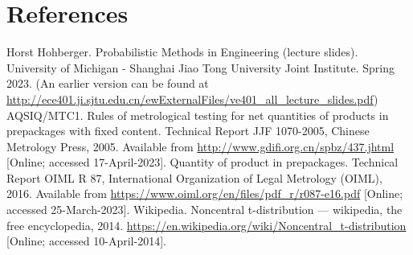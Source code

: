 \documentclass[12pt]{article}
\begin{document}
\newpage
    \section{References}
    \begingroup  %
    \renewcommand{\section}[2]{} 
    \begin{thebibliography}{99}
         Horst Hohberger. Probabilistic Methods in Engineering (lecture slides). University of Michigan - Shanghai Jiao Tong University Joint Institute. Spring 2023. (An earlier version can be found at \href{http://ece401.ji.sjtu.edu.cn/ewExternalFiles/ve401\_all\_lecture\_slides.pdf}{http://ece401.ji.sjtu.edu.cn/ewExternalFiles/ve401\_all\_lecture\_slides.pdf})
         AQSIQ/MTC1. Rules of metrological testing for net quantities of products in prepackages with fixed content. Technical Report JJF 1070-2005, Chinese Metrology Press, 2005. Available from \href{http://www.gdifi.org.cn/spbz/437.jhtml}{http://www.gdifi.org.cn/spbz/437.jhtml} [Online; accessed 17-April-2023].
		 Quantity of product in prepackages. Technical Report OIML R 87, International Organization of Legal Metrology (OIML), 2016. Available from \href{https://www.oiml.org/en/files/pdf\_r/r087-e16.pdf}{https://www.oiml.org/en/files/pdf\_r/r087-e16.pdf} [Online; accessed 25-March-2023].
         Wikipedia. Noncentral t-distribution — wikipedia, the free encyclopedia, 2014. \href{https://en.wikipedia.org/wiki/Noncentral\_t-distribution}{https://en.wikipedia.org/wiki/Noncentral\_t-distribution} [Online; accessed 10-April-2014].
    \end{thebibliography}
    \endgroup
\end{document}
